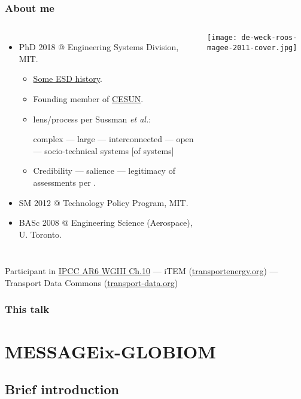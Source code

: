 \documentclass[12pt,aspectratio=169]{beamer}
\begin{document}
\begin{frame}
\frametitle{About me}

\begin{columns}[T]

\begin{itemize}
  \item PhD 2018 @ Engineering Systems Division, MIT.

  \begin{itemize}
    \item \href{https://web.mit.edu/fnl/volume/284/deweck.html}{Some ESD history}.
    \item Founding member of \href{https://cesun.org/about}{CESUN}.
    \item {} lens/process per Sussman \emph{et al.}:

    complex — large — interconnected — open — socio-technical systems [of systems]
    \item Credibility — salience — legitimacy of assessments per \cite{cash-2003}.
  \end{itemize}
  \item SM 2012 @ Technology Policy Program, MIT.
  \item BASc 2008 @ Engineering Science (Aerospace), U. Toronto.
\end{itemize}
\texttt{[image: de-weck-roos-magee-2011-cover.jpg]}
\end{columns}

\smallskip
Participant in \href{https://www.ipcc.ch/report/ar6/wg3/chapter/chapter-10/}{IPCC AR6 WGIII Ch.10} — iTEM (\href{https://transportenergy.org}{transportenergy.org}) — Transport Data Commons (\href{https://transport-data.org}{transport-data.org})
\end{frame}

\begin{frame}
\frametitle{This talk}

\tableofcontents

\end{frame}

\section{MESSAGEix-GLOBIOM}

\subsection{Brief introduction}
\end{document}
